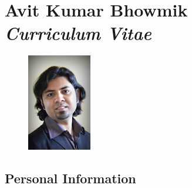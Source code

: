 \chapter{Avit Kumar Bhowmik\\
\textnormal{\textit{Curriculum Vitae}}}
\label{Curriculum Vitae}

\vspace{-7cm}

\begin{figure}[h!]
  \begin{flushright}
    \includegraphics[width=0.25\textwidth]{Figures/Profile_photo.png}
  \end{flushright}
\end{figure}

\section{Personal Information}

\label{Personal Information}

